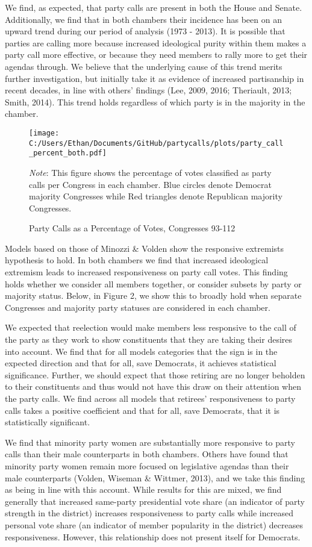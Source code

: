 \documentclass[12pt]{article}
\newcommand\fnote[1]{\captionsetup{font=small}\caption*{#1}}
\begin{document}
We find, as expected, that party calls are present in both the House and Senate. Additionally, we find that in both chambers their incidence has been on an upward trend during our period of analysis (1973 - 2013). It is possible that parties are calling more because increased ideological purity within them makes a party call more effective, or because they need members to rally more to get their agendas through. We believe that the underlying cause of this trend merits further investigation, but initially take it as evidence of increased partisanship in recent decades, in line with others' findings (Lee, 2009, 2016; Theriault, 2013; Smith, 2014). This trend holds regardless of which party is in the majority in the chamber.


\begin{figure}[H]
	\centering
	\caption{Party Calls as a Percentage of Votes, Congresses 93-112}
	\texttt{[image: C:/Users/Ethan/Documents/GitHub/partycalls/plots/party\_call\_percent\_both.pdf]}
	\fnote{\textit{Note}: This figure shows the percentage of votes classified as party calls per Congress in each chamber. Blue circles denote Democrat majority Congresses while Red triangles denote Republican majority Congresses.}
\end{figure}

Models based on those of Minozzi \& Volden show the responsive extremists hypothesis to hold. In both chambers we find that increased ideological extremism leads to increased responsiveness on party call votes. This finding holds whether we consider all members together, or consider subsets by party or majority status. Below, in Figure 2, we show this to broadly hold when separate Congresses and majority party statuses are considered in each chamber.

We expected that reelection would make members less responsive to the call of the party as they work to show constituents that they are taking their desires into account. We find that for all models categories that the sign is in the expected direction and that for all, save Democrats, it achieves statistical significance. Further, we should expect that those retiring are no longer beholden to their constituents and thus would not have this draw on their attention when the party calls. We find across all models that retirees' responsiveness to party calls takes a positive coefficient and that for all, save Democrats, that it is statistically significant.

We find that minority party women are substantially more responsive to party calls than their male counterparts in both chambers. Others have found that minority party women remain more focused on legislative agendas than their male counterparts (Volden, Wiseman \& Wittmer, 2013), and we take this finding as being in line with this account. While results for this are mixed, we find generally that increased same-party presidential vote share (an indicator of party strength in the district) increases responsiveness to party calls while increased personal vote share (an indicator of member popularity in the district) decreases responsiveness. However, this relationship does not present itself for Democrats.
\end{document}
